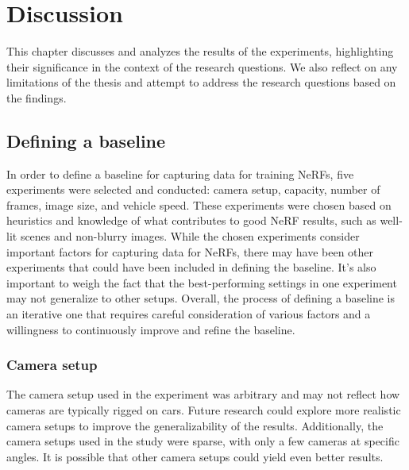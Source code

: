 \chapter{Discussion}
This chapter discusses and analyzes the results of the experiments, highlighting their significance in the context of the research questions. We also reflect on any limitations of the thesis and attempt to address the research questions based on the findings.

\section{Defining a baseline}

\begin{comment}
Points to discuss:
- Main point: Discuss the process of choosing which experiments was chosen.
- There might have been other experiments that should've been included in deciding the baseline.
- The way to choose which experiment goes forward could've been done differently.
- Although one experiment seem to do better with the current chosen setup, it might've done worse in another setup.
\end{comment}

In order to define a baseline for capturing data for training NeRFs, five experiments were selected and conducted: camera setup, capacity, number of frames, image size, and vehicle speed. These experiments were chosen based on heuristics and knowledge of what contributes to good NeRF results, such as well-lit scenes and non-blurry images. While the chosen experiments consider important factors for capturing data for NeRFs, there may have been other experiments that could have been included in defining the baseline. It's also important to weigh the fact that the best-performing settings in one experiment may not generalize to other setups. Overall, the process of defining a baseline is an iterative one that requires careful consideration of various factors and a willingness to continuously improve and refine the baseline.

\subsection{Camera setup}

The camera setup used in the experiment was arbitrary and may not reflect how cameras are typically rigged on cars. Future research could explore more realistic camera setups to improve the generalizability of the results. Additionally, the camera setups used in the study were sparse, with only a few cameras at specific angles. It is possible that other camera setups could yield even better results.

